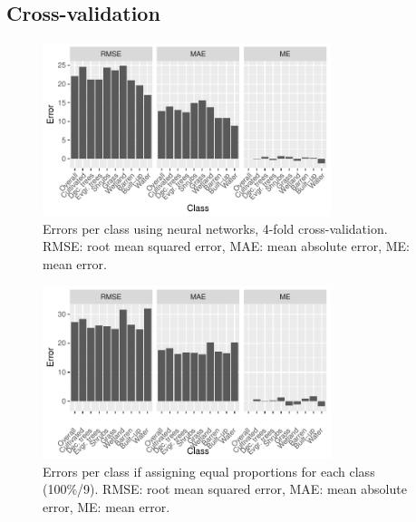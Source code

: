 \documentclass[a4paper,12pt]{scrbook}
\begin{document}
\begin{appendices}
 \section{Cross-validation}
 \begin{figure}[!h]
  \centering
  \includegraphics[width=0.75\textwidth]{thesis-figures/perclass-errors-nn}
  \caption{Errors per class using neural networks, 4-fold cross-validation. RMSE: root mean squared error, MAE: mean absolute error, ME: mean error.}
  \label{fig-perclass-errors-nn}
 \end{figure}
 \begin{figure}[!h]
  \centering
  \includegraphics[width=0.75\textwidth]{thesis-figures/perclass-errors-ctrl}
  \caption{Errors per class if assigning equal proportions for each class (100\%/9). RMSE: root mean squared error, MAE: mean absolute error, ME: mean error.}
  \label{fig-perclass-errors-ctrl}
 \end{figure}
 

\end{appendices}
\end{document}
